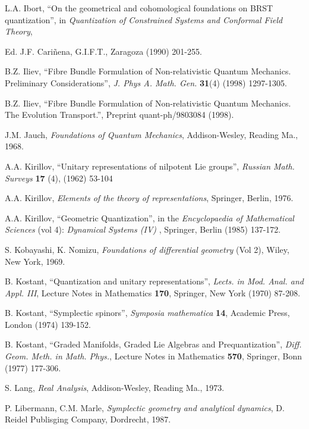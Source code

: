 \documentclass[12pt]{article}
\theoremstyle{plain}
\begin{document}
\begin{thebibliography}{55}
{\sc L.A. Ibort},
``On the geometrical and cohomological foundations on BRST
quantization'',
in {\it Quantization of Constrained Systems and Conformal Field Theory},

Ed. J.F. Cari\~nena, G.I.F.T., Zaragoza (1990) 201-255.

{\sc B.Z. Iliev},
``Fibre Bundle Formulation of Non-relativistic Quantum Mechanics.
Preliminary Considerations'',
{\it J. Phys A. Math. Gen.} {\bf 31}(4) (1998) 1297-1305.

{\sc B.Z. Iliev},
``Fibre Bundle Formulation of Non-relativistic Quantum Mechanics.
The Evolution Transport.'',
Preprint quant-ph/9803084 (1998).

{\sc J.M. Jauch},
{\it Foundations of Quantum Mechanics},
Addison-Wesley, Reading Ma., 1968.

{\sc A.A. Kirillov},
``Unitary representations of nilpotent Lie groups'',
{\it Russian Math. Surveys\/}
{\bf 17} (4), (1962) 53-104

{\sc A.A. Kirillov},
{\it Elements of the theory of representations\/},
Springer, Berlin, 1976.

{\sc A.A. Kirillov},
``Geometric Quantization'',
in the {\it Encyclopaedia of Mathematical Sciences\/}
(vol 4): {\it Dynamical Systems (IV) \/},
Springer, Berlin (1985) 137-172.

{\sc S. Kobayashi, K. Nomizu},
{\it Foundations of differential geometry} (Vol 2),
Wiley, New York, 1969.

{\sc B. Kostant},
``Quantization and unitary representations'',
{\it Lects. in Mod. Anal. and Appl. III},
Lecture Notes in Mathematics {\bf 170}, Springer, New York (1970)
87-208.

{\sc B. Kostant},
``Symplectic spinors'',
{\it Symposia mathematica} {\bf 14}, Academic Press, London (1974)
139-152.

{\sc B. Kostant},
``Graded Manifolds, Graded Lie Algebras and Prequantization'',
{\it Diff. Geom. Meth. in Math. Phys.},
Lecture Notes in Mathematics {\bf 570}, Springer, Bonn (1977) 177-306.

{\sc S. Lang},
{\it Real Analysis},
Addison-Wesley, Reading Ma., 1973.

{\sc P. Libermann, C.M. Marle},
{\it Symplectic geometry and analytical dynamics\/},
D. Reidel Publisging Company,
Dordrecht, 1987.


\end{thebibliography}
\end{document}
